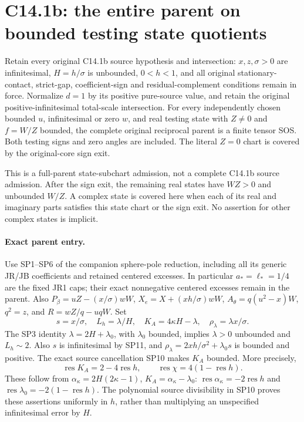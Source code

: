 \section{C14.1b: the entire parent on bounded testing state quotients}
\label{sec:r17-c1-bounded-state}

\begin{theorem}
Retain every original C14.1b source hypothesis and intersection:
$x,z,\sigma>0$ are infinitesimal, $H=h/\sigma$ is unbounded,
$0<h<1$, and all original stationary-contact, strict-gap,
coefficient-sign and residual-complement conditions remain in force.
Normalize $d=1$ by its positive pure-source value, and retain the
original positive-infinitesimal total-scale intersection.
For every independently chosen bounded $u$, infinitesimal or zero $w$,
and real testing state with $Z\ne0$ and $f=W/Z$ bounded, the complete
original reciprocal parent is a finite tensor SOS. Both testing signs
and zero angles are included. The literal $Z=0$ chart is covered by
the original-core sign exit.
\end{theorem}

This is a full-parent state-subchart admission, not a complete C14.1b
source admission. After the sign exit, the remaining real states have
$WZ>0$ and unbounded $W/Z$. A complex state is covered here when
each of its real and imaginary parts satisfies this state chart or
the sign exit. No assertion for other complex states is implicit.

\paragraph{Exact parent entry.}
Use SP1--SP6 of the companion sphere-pole reduction, including all its
generic JR/JB coefficients and retained centered excesses. In particular
$a_*=\ell_*=1/4$ are the fixed JR1 caps; their exact nonnegative
centered excesses remain in the parent. Also
$P_\beta=uZ-(x/\sigma)wW$, $X_e=X+(xh/\sigma)wW$,
$A_\theta=q(u^2-x)W$, $q^2=z$, and $R=wZ/q-uqW$.
Set
\[
 s=x/\sigma,\quad L_h=\lambda/H,\quad
 K_A=4\kappa H-\lambda,\quad \rho_\lambda=\lambda x/\sigma.
\]
The SP3 identity $\lambda=2H+\lambda_0$, with $\lambda_0$ bounded,
implies $\lambda>0$ unbounded and $L_h\sim2$.
Also $s$ is infinitesimal by SP11, and
$\rho_\lambda=2xh/\sigma^2+\lambda_0s$ is bounded and positive.
The exact source cancellation SP10 makes $K_A$ bounded. More precisely,
\[
 \operatorname{res}K_A=2-4\operatorname{res}h,\qquad
 \operatorname{res}\chi=4(1-\operatorname{res}h).
 \tag{BS1}
\]
These follow from $\alpha_\kappa=2H(2\kappa-1)$,
$K_A=\alpha_\kappa-\lambda_0$:
$\operatorname{res}\alpha_\kappa=-2\operatorname{res}h$ and
$\operatorname{res}\lambda_0=-2(1-\operatorname{res}h)$.
The polynomial source divisibility in SP10 proves these assertions
uniformly in $h$, rather than multiplying an unspecified infinitesimal
error by $H$.


